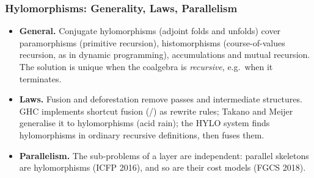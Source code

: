 \backuppart

\begin{frame}
  \frametitle{Hylomorphisms: Generality, Laws, Parallelism}
  \small
  \begin{itemize}
    \item \textbf{General.} Conjugate hylomorphisms (adjoint folds and
      unfolds) cover paramorphisms (primitive recursion), histomorphisms
      (course-of-values recursion, as in dynamic programming),
      accumulations and mutual recursion. The solution is unique when the
      coalgebra is \emph{recursive}, e.g.\ when it terminates.
    \item \textbf{Laws.} Fusion and deforestation remove passes and
      intermediate structures. GHC implements shortcut fusion
      (/) as rewrite rules; Takano and Meijer
      generalise it to hylomorphisms (acid rain); the HYLO system finds
      hylomorphisms in ordinary recursive definitions, then fuses them.
    \item \textbf{Parallelism.} The sub-problems of a layer are
      independent: parallel skeletons are hylomorphisms (ICFP 2016), and
      so are their cost models (FGCS 2018).
  \end{itemize}
\end{frame}

